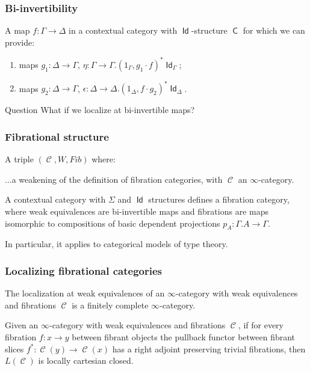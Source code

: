 \documentclass{beamer}
\DeclareMathOperator{\Id}{\mathsf{Id}}
\DeclareMathOperator{\sfC}{\mathsf{C}}
\DeclareMathOperator{\cC}{\mathcal{C}}
\begin{document}
\begin{frame}
  \frametitle{Bi-invertibility}

  \begin{defn}
    A map $f\colon\Gamma\rightarrow\Delta$ in a contextual category with
    $\Id$-structure $\sfC$ for which we can provide:
    \begin{enumerate}
      \item maps $g_1\colon\Delta\rightarrow\Gamma$,
        $\eta\colon\Gamma\rightarrow\Gamma.(1_\Gamma,g_1\cdot f)^*\Id_\Gamma$;
      \item maps $g_2\colon\Delta\rightarrow\Gamma$,
        $\epsilon\colon\Delta\rightarrow\Delta.(1_\Delta,f\cdot g_2)^*\Id_\Delta$.
    \end{enumerate}
  \end{defn}
  \pause

  \begin{block}{Question}
    What if we localize at bi-invertible maps?
  \end{block}
\end{frame}

\begin{frame}
  \frametitle{Fibrational structure}
  
  \begin{defn}
    A triple $(\cC,W,Fib)$ where:

    ...a weakening of the definition of fibration categories, with $\cC$ an
    $\infty$-category.
  \end{defn}
  \pause

  \begin{thm}
    A contextual category with $\Sigma$ and $\Id$ structures defines a
    fibration category, where weak
    equivalences are bi-invertible maps and
    fibrations are maps isomorphic to  compositions of basic dependent
    projections $p_A\colon\Gamma.A\rightarrow\Gamma$.
  \end{thm}
  In particular, it applies to categorical models of type theory.
\end{frame}

\begin{frame}
  \frametitle{Localizing fibrational categories}

  \begin{prop}[Cisinski]
    The localization at weak equivalences of an $\infty$-category with weak
    equivalences and fibrations $\cC$ is a finitely complete $\infty$-category.
  \end{prop}

  \begin{prop}[Cisinski]
    Given an $\infty$-category with weak equivalences and fibrations $\cC$, if
    for every fibration $f\colon x\rightarrow y$ between fibrant objects the
    pullback functor between fibrant slices $f^*\colon\cC(y)\rightarrow\cC(x)$
    has a right adjoint preserving trivial fibrations, then $L(\cC)$ is locally
    cartesian closed.
  \end{prop}
\end{frame}
\end{document}
